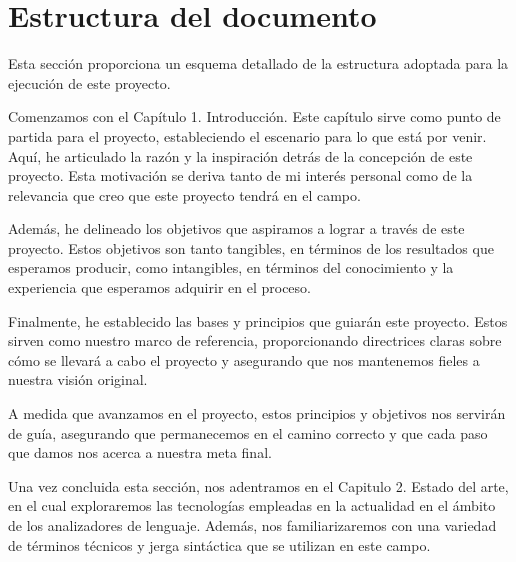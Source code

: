 \section{Estructura del documento}




Esta sección proporciona un esquema detallado de la estructura adoptada para la ejecución de este proyecto.

Comenzamos con el Capítulo 1. Introducción. Este capítulo sirve como punto de partida para el proyecto, estableciendo el escenario para lo que está por venir. Aquí, he articulado la razón y la inspiración detrás de la concepción de este proyecto. Esta motivación se deriva tanto de mi interés personal como de la relevancia que creo que este proyecto tendrá en el campo.

Además, he delineado los objetivos que aspiramos a lograr a través de este proyecto. Estos objetivos son tanto tangibles, en términos de los resultados que esperamos producir, como intangibles, en términos del conocimiento y la experiencia que esperamos adquirir en el proceso.

Finalmente, he establecido las bases y principios que guiarán este proyecto. Estos sirven como nuestro marco de referencia, proporcionando directrices claras sobre cómo se llevará a cabo el proyecto y asegurando que nos mantenemos fieles a nuestra visión original.

A medida que avanzamos en el proyecto, estos principios y objetivos nos servirán de guía, asegurando que permanecemos en el camino correcto y que cada paso que damos nos acerca a nuestra meta final.

Una vez concluida esta sección, nos adentramos en el Capitulo 2. Estado del arte, en el cual exploraremos las tecnologías empleadas en la actualidad en el ámbito de los analizadores de lenguaje. Además, nos familiarizaremos con una variedad de términos técnicos y jerga sintáctica que se utilizan en este campo. 

